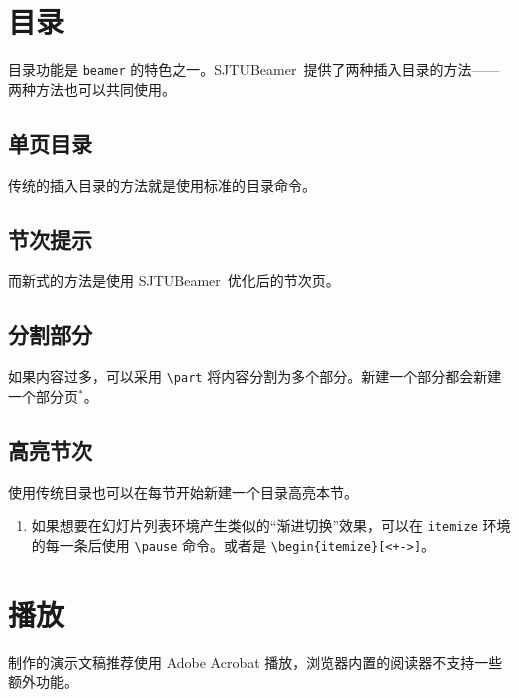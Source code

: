 \documentclass[
    UTF8,
    heading=true,
    12pt,
    a4paper
]{ctexrep}
\newenvironment{commentlist}{\begin{enumerate}\small}{\end{enumerate}}
\def\themename{\textsf{SJTUBeamer}}
\begin{document}
\chapter{目录}

目录功能是 \texttt{beamer} 的特色之一。\themename\ 提供了两种插入目录的方法——两种方法也可以共同使用。

\section{单页目录}

传统的插入目录的方法就是使用标准的目录命令。


\section{节次提示}

而新式的方法是使用 \themename\ 优化后的节次页。


\section{分割部分}

如果内容过多，可以采用 \texttt{\textbackslash{}part} 将内容分割为多个部分。新建一个部分都会新建一个部分页$^*$。


\section{高亮节次}

使用传统目录也可以在每节开始新建一个目录高亮本节。


\begin{commentlist}
  \item 如果想要在幻灯片列表环境产生类似的“渐进切换”效果，可以在 \texttt{itemize} 环境的每一条后使用 \texttt{\textbackslash{}pause} 命令。或者是 \texttt{\textbackslash{}begin\{itemize\}[<+->]}。
\end{commentlist}

\chapter{播放}

制作的演示文稿推荐使用 Adobe Acrobat 播放，浏览器内置的阅读器不支持一些额外功能。
\end{document}
